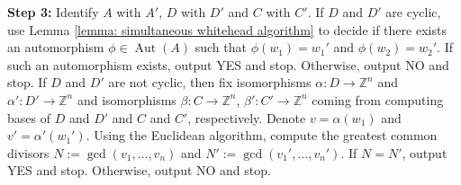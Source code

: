 \documentclass{amsart}
\newcommand{\Z}{\mathbb{Z}}
\DeclareMathOperator{\Aut}{Aut}
\theoremstyle{plain}
\theoremstyle{definition}
\theoremstyle{remark}
\begin{document}
\textbf{Step 3:} Identify $A$ with $A'$, $D$ with $D'$ and $C$ with $C'$. If $D$ and $D'$ are cyclic, use Lemma \ref{lemma: simultaneous whitehead algorithm} to decide if there exists an automorphism $\phi \in \Aut(A)$ such that $\phi(w_1) = w_1'$ and $\phi(w_2) = w_2'$. If such an automorphism exists, output YES and stop. Otherwise, output NO and stop. If $D$ and $D'$ are not cyclic, then fix isomorphisms $\alpha : D \to \Z^n$ and $\alpha' : D' \to \Z^n$ and isomorphisms $\beta : C \to \Z^n$, $\beta' : C' \to \Z^n$ coming from computing bases of $D$ and $D'$ and $C$ and $C'$, respectively. Denote $v = \alpha(w_1)$ and $v' = \alpha'(w_1')$. Using the Euclidean algorithm, compute the greatest common divisors $N:=\gcd(v_1,\ldots,v_n)$ and $N':= \gcd(v_1',\ldots,v_n')$. If $N=N'$, output YES and stop. Otherwise, output NO and stop. 
\end{document}
